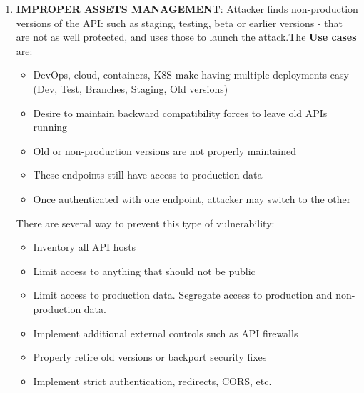 \documentclass[10pt,a4paper]{report}
\begin{document}
\begin{enumerate}
\begin{itemize}
	\end{itemize}


		\item \textbf{IMPROPER ASSETS MANAGEMENT}: Attacker finds non-production versions of the API: such as staging, testing, beta or earlier versions - that are not as well protected, and uses	those to launch the attack.The \textbf{Use cases} are:
	\begin{itemize}
		\item DevOps, cloud, containers, K8S make having multiple deployments
		easy (Dev, Test, Branches, Staging, Old versions)
		\item Desire to maintain backward compatibility forces to leave old APIs
		running
		\item Old or non-production versions are not properly maintained
		\item These endpoints still have access to production data
		\item Once authenticated with one endpoint, attacker may switch to the
		other
		
	\end{itemize}
	There are several way to prevent this type of vulnerability:
	\begin{itemize}
		\item Inventory all API hosts
		\item Limit access to anything that should not be public
		\item Limit access to production data. Segregate access to production and
		non-production data.
		\item Implement additional external controls such as API firewalls
		\item Properly retire old versions or backport security fixes
		\item Implement strict authentication, redirects, CORS, etc. 
		
	\end{itemize}


\end{enumerate}
\end{document}
